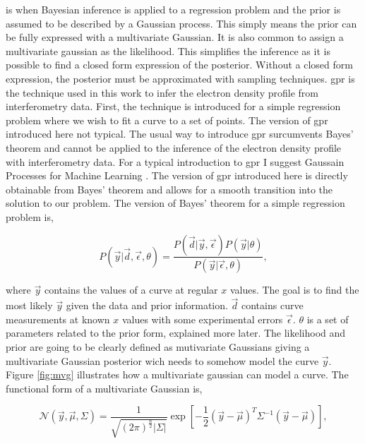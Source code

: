  is when Bayesian inference is applied to a regression problem and the prior is assumed to be described by a Gaussian process. This simply means the prior can be fully expressed with a multivariate Gaussian. It is also common to assign a multivariate gaussian as the likelihood. This simplifies the inference as it is possible to find a closed form expression of the posterior. Without a closed form expression, the posterior must be approximated with sampling techniques. \gls{gpr} is the technique used in this work to infer the electron density profile from interferometry data. First, the technique is introduced for a simple regression problem where we wish to fit a curve to a set of points. The version of \gls{gpr} introduced here not typical. The usual way to introduce \gls{gpr} surcumvents Bayes' theorem and cannot be applied to the inference of the electron density profile with interferometry data. For a typical introduction to \gls{gpr} I suggest Gaussain Processes for Machine Learning \cite{gp4ml}. The version of \gls{gpr} introduced here is directly obtainable from Bayes' theorem and allows for a smooth transition into the solution to our problem. The version of Bayes' theorem for a simple regression problem is,

\begin{equation} 
  P(\vec{y}|\vec{d},\vec \epsilon, \theta) = \frac{P(\vec{d}|\vec{y},\vec \epsilon) P(\vec y|\theta)}{P(\vec y|\vec \epsilon, \theta)},
  \label{eq:bayesth_simple_regression}
\end{equation}

where $\vec y$ contains the values of a curve at regular $x$ values. The goal is to find the most likely $\vec y$ given the data and prior information. $\vec d$ contains curve measurements at known $x$ values with some experimental errors $\vec \epsilon$. $\theta$ is a set of parameters related to the prior form, explained more later. The likelihood and prior are going to be clearly defined as mutivariate Gaussians giving a multivariate Gaussian posterior wich needs to somehow model the curve $\vec y$. Figure \ref{fig:mvg} illustrates how a multivariate gaussian can model a curve. The functional form of a multivariate Gaussian is,

\begin{equation}
  \mathcal{N}(\vec y, \vec{\mu}, \Sigma) = \frac{1}{\sqrt{(2\pi)^{\frac{n}{2}}|\Sigma|}} \exp \left[{{-\frac{1}{2}(\vec{y}-\vec{\mu})^T\Sigma^{-1}(\vec{y}-\vec{\mu})}}\right],
  \label{eq:mvg}
\end{equation}

